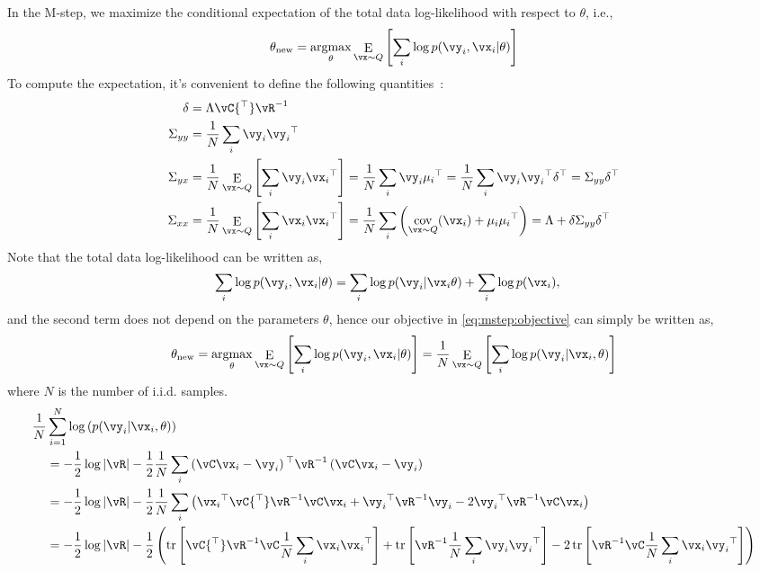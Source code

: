 \documentclass{article}
\DeclareMathOperator*{\E}{\rm E}
\DeclareMathOperator*{\cov}{cov}
\DeclareMathOperator*{\argmax}{\rm argmax}
\DeclareMathOperator{\tr}{tr}
\newcommand{\trp}{{^\top}} %
\newcommand{\inv}{^{-1}}
\newcommand{\oneHalf}{\frac{1}{2}}
\newcounter{ct}
\begin{document}
In the M-step, we maximize the conditional expectation of the total data
log-likelihood with respect to $\theta$, i.e.,
\begin{align}\label{eq:mstep:objective}
    \theta_{\mathrm{new}} =
	\argmax_\theta
	\E_{\vx\sim Q}
	    \left[
		\sum_i \log
		    p(\vy_i, \vx_i|\theta)
	    \right]
\end{align}
To compute the expectation, it's convenient to define the following quantities~\cite{Rubin1982}:
\begin{align}
    \delta &= \Lambda \vC\trp \vR\inv\\
    \Sigma_{yy} &= \frac{1}{N}\sum_i \vy_i \vy_i\trp\\
    \Sigma_{yx} &= \frac{1}{N}\E_{\vx \sim Q} \left[ \sum_i \vy_i \vx_i\trp \right]
	= \frac{1}{N}\sum_i \vy_i \mu_i\trp
	= \frac{1}{N}\sum_i \vy_i \vy_i\trp \delta\trp
	= \Sigma_{yy} \delta\trp\\
    \Sigma_{xx} &= \frac{1}{N}\E_{\vx \sim Q} \left[ \sum_i \vx_i \vx_i\trp \right]
	= \frac{1}{N} \sum_i 
	    \left(
		\cov_{\vx\sim Q}(\vx_i) + \mu_i\mu_i\trp
	    \right)
	= \Lambda + \delta\Sigma_{yy}\delta\trp
\end{align}
Note that the total data log-likelihood can be written as,
\begin{align}
    \sum_i \log p(\vy_i, \vx_i|\theta) 
    &=
    \sum_i \log p(\vy_i| \vx_i\theta) 
    +
    \sum_i \log p(\vx_i),
\end{align}
and the second term does not depend on the parameters $\theta$, hence
our objective in \eqref{eq:mstep:objective} can simply be written as,
\begin{align}
\theta_{\mathrm{new}} =
    \argmax_\theta
    \E_{\vx\sim Q}
	\left[
	    \sum_i \log
		p(\vy_i, \vx_i|\theta)
	\right] =
\frac{1}{N}\E_{\vx\sim Q}
    \left[
	\sum_i \log
	    p(\vy_i| \vx_i, \theta)
    \right]
\end{align}
where $N$ is the number of i.i.d. samples.
\begin{align*}
\frac{1}{N} & \sum_{i=1}^N \log\left(
	p(\vy_i| \vx_i, \theta)
    \right)
    \nonumber\\
    &=
    -\oneHalf \log |\vR|
    -\oneHalf 
    \frac{1}{N}
    \sum_i
	\left(\vC \vx_i - \vy_i\right)\trp
	\vR\inv
	\left(\vC \vx_i - \vy_i\right)
    \\
    &=
    -\oneHalf \log |\vR|
    -\oneHalf 
    \frac{1}{N}
    \sum_i
	\left(
	    \vx_i\trp\vC\trp \vR\inv \vC \vx_i
	    +\vy_i\trp \vR\inv \vy_i
	    -2\vy_i\trp \vR\inv \vC \vx_i
	\right)
    \\
    &=
    -\oneHalf \log |\vR|
    -\oneHalf 
	\left(
	    \tr\left[
		\vC\trp \vR\inv \vC 
		\frac{1}{N} \sum_i
		    \vx_i\vx_i\trp
	    \right]
	    +
	    \tr\left[
		\vR\inv 
		\frac{1}{N} \sum_i
		    \vy_i \vy_i\trp 
	    \right]
	    -
	    2\tr\left[
		\vR\inv \vC 
		\frac{1}{N} \sum_i
		    \vx_i \vy_i\trp 
	    \right]
	\right)
\end{align*}
\end{document}
